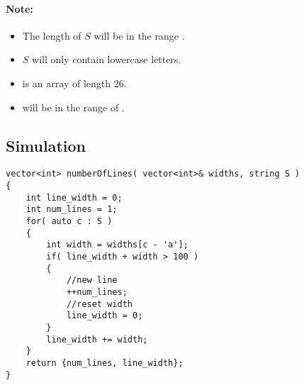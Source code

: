 \paragraph{Note:}

\begin{itemize}
\item The length of $S$ will be in the range \fcj{[1, 1000]}.

\item $ S $ will only contain lowercase letters.

\item {} is an array of length 26.

\item {} will be in the range of \fcj{[2, 10]}.
\end{itemize}

\subsection{Simulation}

\setcounter{lstlisting}{0}
\begin{lstlisting}[style=customc, caption={Simulation}]
vector<int> numberOfLines( vector<int>& widths, string S )
{
    int line_width = 0;
    int num_lines = 1;
    for( auto c : S )
    {
        int width = widths[c - 'a'];
        if( line_width + width > 100 )
        {
            //new line
            ++num_lines;
            //reset width
            line_width = 0;
        }
        line_width += width;
    }
    return {num_lines, line_width};
}
\end{lstlisting}
